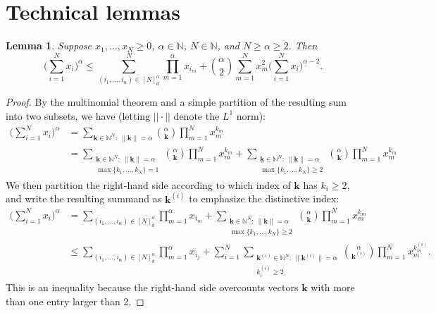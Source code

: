 \documentclass[a4paper,11pt]{article}
\newtheorem{lem}{Lemma}
\theoremstyle{definition}
\newcommand{\bbN}{\mathbb{N}}
\newcommand{\bfk}{\mathbf{k}}
\begin{document}
\section{Technical lemmas}\label{app:lemmas}

\begin{lem} \label{lem:multinomial}
Suppose $x_1,\dots,x_N \geq0$, $\alpha \in \bbN$, $N \in \bbN$, and $N \geq \alpha \geq 2$.
Then
\begin{equation} \label{eq:multinomial}
\Bigg(\sum_{i=1}^N x_i\Bigg)^\alpha \leq \sum_{ ( i_1,\dots,i_\alpha ) \in [ N ]_d^{ \alpha }  }^N \prod_{ m = 1 }^\alpha x_{ i_m } + \binom{\alpha}{2}\sum_{ m = 1 }^N x_m^2 \Bigg(\sum_{i=1}^N x_i\Bigg)^{\alpha-2}.
\end{equation}
\end{lem}
\begin{proof}
By the multinomial theorem and a simple partition of the resulting sum into two subsets, we have (letting $||\cdot||$ denote the $L^1$ norm):
\begin{align*}
\Bigg(\sum_{i=1}^N x_i\Bigg)^\alpha &= \sum_{\bfk \in \bbN^N:\:\| \bfk\| = \alpha} \binom{\alpha}{\bfk} \prod_{m=1}^N x_m^{k_m}\\
&= \sum_{\substack{\bfk \in \bbN^N:\:\| \bfk\| = \alpha\\\max\{ k_1, \ldots, k_N \} = 1}} \binom{\alpha}{\bfk} \prod_{m=1}^N x_m^{k_m}
 + \sum_{\substack{\bfk \in \bbN^N:\:\| \bfk\| = \alpha\\\max\{ k_1, \ldots, k_N \} \geq 2}} \binom{\alpha}{\bfk} \prod_{m=1}^N x_m^{k_m}
\end{align*}
We then partition the right-hand side according to which index of $\bfk$ has $k_i \geq 2$, and write the resulting summand as $\bfk^{(i)}$ to emphasize the distinctive index:
\begin{align*}
\Bigg(\sum_{i=1}^N x_i\Bigg)^\alpha &= \sum_{ ( i_1,\dots,i_\alpha ) \in [ N ]_d^{ \alpha } } \prod_{m=1}^\alpha x_{i_m} + \sum_{\substack{\bfk \in \bbN^N:\:\| \bfk\| = \alpha\\\max\{ k_1, \ldots, k_N \} \geq 2}} \binom{\alpha}{\bfk} \prod_{m=1}^N x_m^{k_m}\\
&\leq \sum_{ ( i_1,\dots,i_\alpha ) \in [ N ]_d^{ \alpha } } \prod_{m=1}^\alpha x_{i_j} + \sum_{i=1}^N \sum_{\substack{\bfk^{(i)} \in \bbN^N:\:\| \bfk^{(i)}\| = \alpha\\ k^{(i)}_i \geq 2}} \binom{\alpha}{\bfk^{(i)}} \prod_{m=1}^N x_m^{k^{(i)}_m}.
\end{align*}
This is an inequality because the right-hand side overcounts vectors $\bfk$ with more than one entry larger than 2.

\end{proof}
\end{document}
